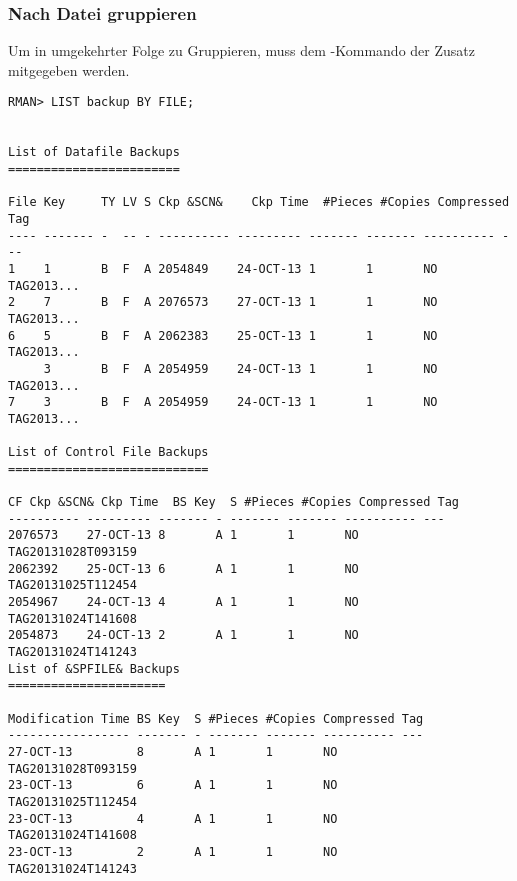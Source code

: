         \subsubsection{Nach Datei gruppieren}
          Um in umgekehrter Folge zu Gruppieren, muss dem
          -Kommando der Zusatz 
          mitgegeben werden.

          \begin{lstlisting}[caption={\languagerman{LIST} - Backups, gruppiert nach Backup Datei anzeigen},label=admin1349,language=rman]
RMAN> LIST backup BY FILE;


List of Datafile Backups
========================

File Key     TY LV S Ckp &SCN&    Ckp Time  #Pieces #Copies Compressed Tag
---- ------- -  -- - ---------- --------- ------- ------- ---------- ---
1    1       B  F  A 2054849    24-OCT-13 1       1       NO         TAG2013...
2    7       B  F  A 2076573    27-OCT-13 1       1       NO         TAG2013...
6    5       B  F  A 2062383    25-OCT-13 1       1       NO         TAG2013...
     3       B  F  A 2054959    24-OCT-13 1       1       NO         TAG2013...
7    3       B  F  A 2054959    24-OCT-13 1       1       NO         TAG2013...

List of Control File Backups
============================

CF Ckp &SCN& Ckp Time  BS Key  S #Pieces #Copies Compressed Tag
---------- --------- ------- - ------- ------- ---------- ---
2076573    27-OCT-13 8       A 1       1       NO         TAG20131028T093159
2062392    25-OCT-13 6       A 1       1       NO         TAG20131025T112454
2054967    24-OCT-13 4       A 1       1       NO         TAG20131024T141608
2054873    24-OCT-13 2       A 1       1       NO         TAG20131024T141243
List of &SPFILE& Backups
======================

Modification Time BS Key  S #Pieces #Copies Compressed Tag
----------------- ------- - ------- ------- ---------- ---
27-OCT-13         8       A 1       1       NO         TAG20131028T093159
23-OCT-13         6       A 1       1       NO         TAG20131025T112454
23-OCT-13         4       A 1       1       NO         TAG20131024T141608
23-OCT-13         2       A 1       1       NO         TAG20131024T141243
          \end{lstlisting}
\clearpage		  

